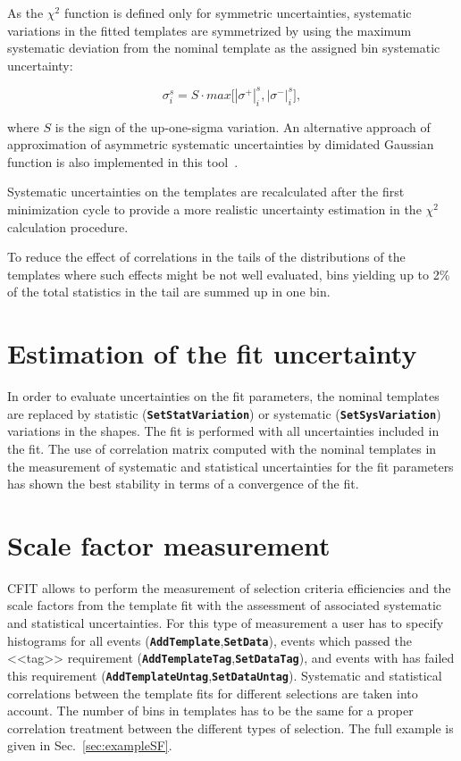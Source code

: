 \documentclass[12pt]{article}
\newcommand\verbbf[1]{\textcolor[rgb]{0,0,1}{\texttt{\textbf{#1}}}}
\begin{document}
As the $\chi^2$ function is defined only for symmetric
uncertainties, systematic variations in the fitted templates are
symmetrized by using the maximum systematic deviation from the nominal
template as the assigned bin systematic uncertainty:

\begin{equation}
\sigma_{i}^{s} = S \cdot max
\bigg[|\sigma^{+}|_{i}^{s},|\sigma^{-}|_{i}^{s}\bigg],
\end{equation}

\noindent where $S$ is the sign of the
up-one-sigma variation. An alternative approach of approximation of
asymmetric systematic uncertainties by dimidated Gaussian function is
also implemented in this tool~\cite{Barlow}.

Systematic uncertainties on the templates are recalculated after the
first minimization cycle to provide a more realistic
uncertainty estimation in the $\chi^2$ calculation procedure.

To reduce the effect of correlations in the tails of the distributions
of the templates where such effects might be not well evaluated, bins
yielding up to 2\% of the total statistics in the tail are summed up in one bin.

\section{Estimation of the fit uncertainty}

In order to evaluate uncertainties on the fit parameters, the nominal
templates are replaced by statistic (\verbbf{SetStatVariation}) or systematic
(\verbbf{SetSysVariation}) variations in the
shapes. The fit is performed with all uncertainties included in the fit.
The use of correlation matrix computed with the nominal templates in the
measurement of systematic and statistical uncertainties for the fit
parameters has shown the best stability in terms of a convergence of
the fit. 

\section{Scale factor measurement}

CFIT allows to perform the measurement of selection criteria efficiencies and the
scale factors from the template fit with the assessment of associated systematic and
statistical uncertainties. For this type of measurement a user has to
specify histograms for all events
(\verbbf{AddTemplate},\verbbf{SetData}), events which passed
the <<tag>> requirement (\verbbf{AddTemplateTag},\verbbf{SetDataTag}), and events with has failed
this requirement (\verbbf{AddTemplateUntag},\verbbf{SetDataUntag}).
Systematic and statistical correlations between the
template fits for different selections are
taken into account. The number of bins in templates has to be the same
for a proper correlation treatment between the different types of selection.
The full example is given in Sec.~\ref{sec:exampleSF}.
\end{document}

